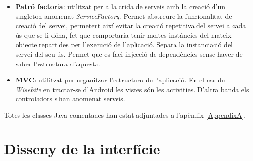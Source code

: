 \begin{itemize}
\item \textbf{Patró factoria}: utilitzat per a la crida de serveis amb la creació d'un singleton anomenat \textit{ServiceFactory}. Permet abstreure la funcionalitat de creació del servei, permetent així evitar la creació repetitiva del servei a cada ús que se li dóna, fet que comportaria tenir moltes instàncies del mateix objecte repartides per l'execució de l'aplicació. Separa la instanciació del servei del seu ús. Permet que es faci injecció de dependències sense haver de saber l'estructura d'aquesta.

\item \textbf{MVC}: utilitzat per organitzar l'estructura de l'aplicació. En el cas de \textit{Wisebite} en tractar-se d'Android les vistes són les activities. D'altra banda els controladors s'han anomenat serveis.
\end{itemize}

\noindent Totes les classes Java comentades han estat adjuntades a l'apèndix \ref{AppendixA}.


\section{Disseny de la interfície}

